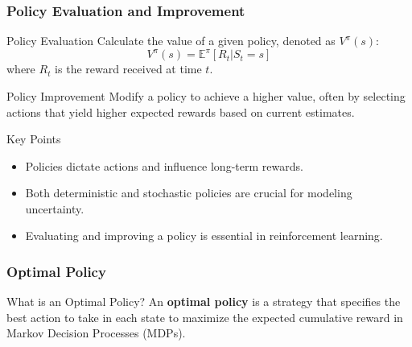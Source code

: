 \documentclass[aspectratio=169]{beamer}
\begin{document}
\begin{frame}[fragile]
    \frametitle{Policy Evaluation and Improvement}
    \begin{block}{Policy Evaluation}
        Calculate the value of a given policy, denoted as \( V^\pi(s) \):
        \[
            V^\pi(s) = \mathbb{E}^\pi \left[ R_t | S_t = s \right]
        \]
        where \( R_t \) is the reward received at time \( t \).
    \end{block}

    \begin{block}{Policy Improvement}
        Modify a policy to achieve a higher value, often by selecting actions that yield higher expected rewards based on current estimates.
    \end{block}

    \begin{block}{Key Points}
        \begin{itemize}
            \item Policies dictate actions and influence long-term rewards.
            \item Both deterministic and stochastic policies are crucial for modeling uncertainty.
            \item Evaluating and improving a policy is essential in reinforcement learning.
        \end{itemize}
    \end{block}
\end{frame}

\begin{frame}[fragile]
    \frametitle{Optimal Policy}
    \begin{block}{What is an Optimal Policy?}
        An \textbf{optimal policy} is a strategy that specifies the best action to take in each state to maximize the expected cumulative reward in Markov Decision Processes (MDPs).
    \end{block}
\end{frame}
\end{document}
